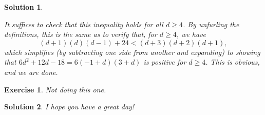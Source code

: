 \documentclass{article}
\newtheorem{ex}{Exercise}
\theoremstyle{nonumberplain}
\newtheorem{sol}{Solution}
\begin{document}
\begin{sol}
\begin{enumerate}
It suffices to check that this inequality holds for all $d \geq 4$. By unfurling the definitions, this is the same as to verify that, for $d \geq 4$, we have
\begin{equation}
(d+1)(d)(d-1) + 24 < (d+3)(d+2)(d+1),
\end{equation}
which simplifies (by subtracting one side from another and expanding) to showing that $6 d^2 + 12 d -18 = 6 (-1 + d) (3 + d)$ is positive for $d \geq 4$. This is obvious, and we are done.
\end{enumerate}
\end{sol}

\begin{ex}
Not doing this one.
\end{ex}

\begin{sol}
I hope you have a great day!
\end{sol}
\end{document}
